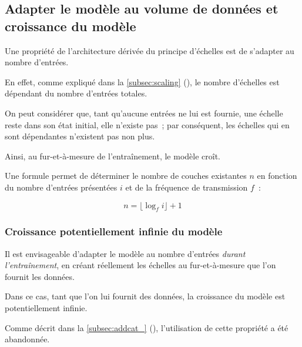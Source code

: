 {\subsection{Adapter le modèle au volume de données et croissance du modèle}
Une propriété de l'architecture dérivée du principe d'échelles est de s'adapter au nombre d'entrées.

En effet, comme expliqué dans la \autoref{subsec:scaling} (), le nombre d'échelles est dépendant du nombre d'entrées totales. 

On peut considérer que, tant qu'aucune entrées ne lui est fournie, une échelle reste dans son état initial, elle n'\og existe\fg{} pas~; par conséquent, les échelles qui en sont dépendantes n'existent pas non plus.

Ainsi, au fur-et-à-mesure de l'entraînement, le modèle croît.

Une formule permet de déterminer le nombre de couches \og existantes\fg{} $n$ en fonction du nombre d'entrées présentées $i$ et de la fréquence de transmission $f$~:

\[n = \lfloor\log_f i\rfloor + 1\]\label{growth_formula}

\subsubsection{Croissance potentiellement infinie du modèle}\label{inf_growth}
Il est envisageable d'adapter le modèle au nombre d'entrées \textit{durant l'entraînement}, en créant réellement les échelles au fur-et-à-mesure que l’on fournit les données.

Dans ce cas, tant que l'on lui fournit des données, la croissance du modèle est potentiellement infinie.

Comme décrit dans la \autoref{subsec:addcat_} (), l'utilisation de cette propriété a été abandonnée.

%
%	
}